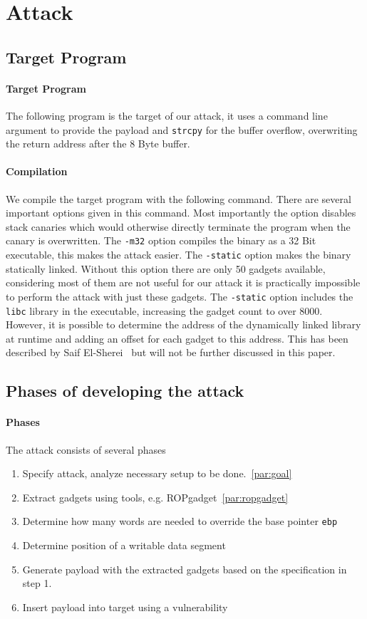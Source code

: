 \documentclass[journal=tosc,submission, notanonymous]{iacrtrans}
\begin{document}
\section{Attack}
\label{sec:attack}
\subsection{Target Program}
\paragraph{Target Program}
The following program is the target of our attack, it uses a command line argument to provide the payload and \Verb+strcpy+ for the buffer overflow, overwriting the return address after the 8 Byte buffer.
\paragraph{Compilation}
We compile the target program with the following command. There are several important options given in this command. Most importantly the  option disables stack canaries which would otherwise directly terminate the program when the canary is overwritten. The \Verb+-m32+ option compiles the binary as a 32 Bit executable, this makes the attack easier. The \Verb+-static+ option makes the binary statically linked. Without this option there are only 50 gadgets available, considering most of them are not useful for our attack it is practically impossible to perform the attack with just these gadgets. The \Verb+-static+ option includes the \Verb+libc+ library in the executable, increasing the gadget count to over 8000. However, it is possible to determine the address of the dynamically linked library at runtime and adding an offset for each gadget to this address. This has been described by Saif El-Sherei~\cite{el-sherei} but will not be further discussed in this paper.
\subsection{Phases of developing the attack}
\paragraph{Phases}
The attack consists of several phases
\begin{enumerate}
  \item Specify attack, analyze necessary setup to be done.~\cref{par:goal}
  \item Extract gadgets using tools, e.g. ROPgadget~\cref{par:ropgadget}
  \item Determine how many words are needed to override the base pointer \Verb+ebp+
  \item Determine position of a writable data segment
  \item Generate payload with the extracted gadgets based on the specification in step 1.
  \item Insert payload into target using a vulnerability
\end{enumerate}
\end{document}
